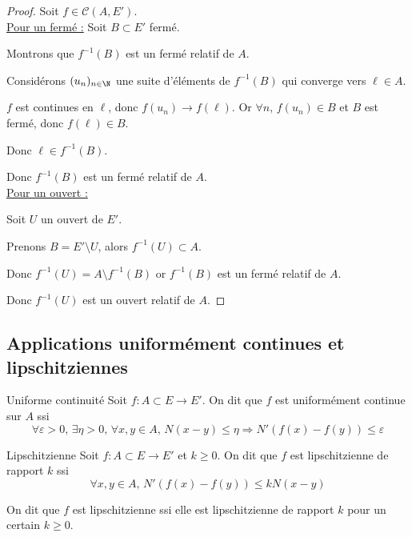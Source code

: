 \begin{proof}
    Soit $f \in \mathscr C(A, E')$. \\

    \uline{Pour un fermé :}
    Soit $B \subset E'$ fermé. 

    Montrons que $f^{-1}(B)$ est un fermé relatif de $A$.

    Considérons $(u_n) _{n \in \N}$ une suite d'éléments de $f^{-1}(B)$ qui converge vers $\ell \in A$.

    $f$ est continues en $\ell$, donc $f(u_n) \rightarrow f(\ell)$. 
    Or $\forall n, \, f(u_n) \in B$ et $B$ est fermé, donc $f(\ell) \in B$.

    Donc $\ell \in f^{-1}(B)$. 

    Donc $f^{-1}(B)$ est un fermé relatif de $A$. \\

    \uline{Pour un ouvert :}

    \svspace Soit $U$ un ouvert de $E'$.

    Prenons $B = E' \setminus U$, alors $f^{-1}(U) \subset A$. 

    Donc $f^{-1}(U) = A \setminus f^{-1}(B)$ or $f^{-1}(B)$ est un fermé relatif de $A$.

    Donc $f^{-1}(U)$ est un ouvert relatif de $A$.
\end{proof}

\subsection{Applications uniformément continues et lipschitziennes}

\begin{definition}{Uniforme continuité}{}
    Soit $f : A \subset E \to E'$. On dit que $f$ est uniformément continue sur $A$ ssi 
    $$\forall \varepsilon > 0, \, \exists \eta > 0, \, \forall x, y \in A, \, N(x - y) \leqslant \eta \Rightarrow N'(f(x) - f(y)) \leqslant \varepsilon$$
\end{definition}

\begin{definition}{Lipschitzienne}{}
    Soit $f : A \subset E \to E'$ et $k \geqslant 0$. On dit que $f$ est lipschitzienne 
    de rapport $k$ ssi 
    $$\forall x, y \in A, \, N'(f(x) - f(y)) \leqslant k N(x - y)$$

    On dit que $f$ est lipschitzienne ssi elle est lipschitzienne de rapport $k$ pour un certain $k \geqslant 0$.
\end{definition}


